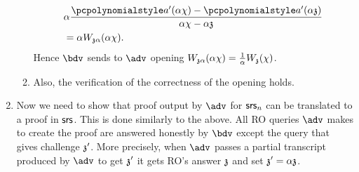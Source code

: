 \documentclass[runningheads,11pt]{llncs}
\begin{document}
\begin{enumerate}
\begin{enumerate}
\begin{align}
                      & \alpha \frac{\p{a'} (\alpha \chi) - \p{a'} (\alpha \chz)}{\alpha \chi -
                        \alpha \chz} \\
                      & = \alpha W_{\chz \alpha} (\alpha \chi).
    \end{align}
    Hence $\bdv$ sends to $\adv$ opening $W_{\mathfrak{z} \alpha} (\alpha \chi) =
    \frac{1}{\alpha} W_{\mathfrak{z}} (\chi)$.
  \item Also, the verification of the correctness of the opening
    holds. 
\end{enumerate}
\item Now we need to show that proof output by $\adv$ for $\mathsf{srs}_n$ can be
  translated to a proof in $\mathsf{srs}$. This is done similarly to the above. All RO
  queries $\adv$ makes to create the proof are answered honestly by $\bdv$
  except the query that gives challenge $\mathfrak{z}'$. More precisely, when $\adv$
  passes a partial transcript produced by $\adv$ to get $\mathfrak{z}'$ it gets RO's
  answer $\mathfrak{z}$ and set $\mathfrak{z}' = \alpha \mathfrak{z}$.


\end{enumerate}
\end{document}
